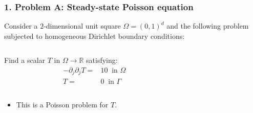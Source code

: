 \begin{frame}
	\frametitle{\textbf{1. Problem A: Steady-state Poisson equation}}
    
    Consider a $2$-dimensional unit square $\Omega = (0,1)^d$ and the following problem subjected to homogeneous Dirichlet boundary conditions: 
    \vspace{0.5cm}
    \begin{columns}[c]
    \begin{column}{0.5\textwidth}
    \begin{framed}
    Find a scalar $T$ in $\Omega \rightarrow \mathbb{R}$ satisfying:
    \begin{align*}
        -\partial_j \partial_j T =& 10 \ \textrm{ in } \Omega\\
         T =& 0 \ \textrm{ in } \Gamma
    \end{align*}
    \end{framed}
    \end{column}
    \begin{column}{0.4\textwidth}
    \vspace*{-\baselineskip}
    \begin{center}
    	
    \end{center}
    \end{column}
    \end{columns}
    
    \vspace{0.4cm}
    \begin{itemize}
        \item This is a Poisson problem for $T$. 
    \end{itemize}    

\end{frame}


